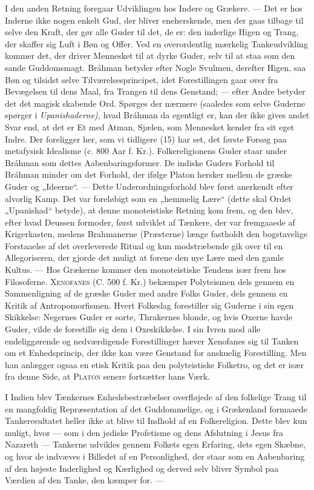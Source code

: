 \documentclass[12pt,a4paper,openany]{book}
\newcommand{\opage}[1]{\marginnote{\footnotesize\textit{[#1]}}}
\begin{document}
I den anden Retning foregaar Udviklingen hos Indere og Grækere. --- Det
er hos Inderne ikke nogen enkelt Gud, der bliver eneherskende, men der
gaas tilbage til selve den Kraft, der gør alle Guder til det, de er: den
inderlige Higen og Trang, der skaffer sig Luft i Bøn og Offer. Ved en
overordentlig mærkelig Tankeudvikling kommer det, der driver Mennesket
til at dyrke Guder, selv til at staa som den sande Guddomsmagt.
\opage{104}Bráhman betyder efter Nogle Svulmen, derefter Higen, saa Bøn
og tilsidst selve Tilværelsesprincipet, idet Forestillingen gaar over
fra Bevægelsen til dens Maal, fra Trangen til dens Genstand; --- efter
Andre betyder det det magisk skabende Ord. Spørges der nærmere (saaledes
som selve Guderne spørger i \textit{Upanishaderne),} hvad Bráhman da
egentligt er, kan der ikke gives andet Svar end, at det er Et med Atman,
Sjælen, som Mennesket kender fra sit eget Indre. Der foreligger her, som
vi tidligere (15) har set, det første Forsøg paa metafysisk Idealisme
(c. 800 Aar f. Kr.). Folkereligionens Guder staar under Bráhman som
dettes Aabenbaringsformer. De indiske Guders Forhold til Bráhman minder
om det Forhold, der ifølge Platon hersker mellem de græske Guder og
„Ideerne“. --- Dette Underordningsforhold blev først anerkendt efter
alvorlig Kamp. Det var foreløbigt som en „hemmelig Lære“ (dette skal
Ordet „Upanishad“ betyde), at denne monoteistiske Retning kom frem, og
den blev, efter hvad Deussen formoder, først udviklet af Tænkere, der
var fremgaaede af Krigerkasten, medens Brahmanerne (Præsterne) længe
fastholdt den bogstavelige Forstaaelse af det overleverede Ritual og kun
modstræbende gik over til en Allegoriseren, der gjorde det muligt at
forene den nye Lære med den gamle Kultus. --- Hos Grækerne kommer den
monoteistiske Tendens især frem hos Filosoferne. \textsc{Xenofanes} (C.
500 f. Kr.) bekæmper Polyteismen dels gennem en Sammenligning af de
græske Guder med andre Folks Guder, dels gennem en Kritik af
Antropomorfismen. Hvert Folkeslag forestiller sig Guderne i sin egen
Skikkelse: Negernes Guder er sorte, Thrakernes blonde, og hvis Oxerne
havde Guder, vilde de forestille sig dem i Oxeskikkelse. I sin Ivren mod
alle endeliggørende og nedværdigende Forestillinger hæver Xenofanes sig
til Tanken om et Enhedsprincip, der ikke kan være Genstand for anskuelig
Forestilling. Men han anlægger ogsaa en etisk Kritik paa den
polyteistiske Folketro, og det er især fra denne Side, at
\textsc{Platon} senere fortsætter hans Værk.

I Indien blev Tænkernes Enhedsbestræbelser overfløjede af den folkelige
Trang til en mangfoldig Repræsentation af det Guddommelige, og i
Grækenland formaaede Tankeresultatet heller ikke at blive til Indhold af
en Folkereligion. Dette blev kun muligt, hvor --- som i den jødiske
Profetisme og dens Afslutning i Jesus fra Nazareth --- Tankerne udvikles
gennem Folkets egen Erfaring, dets egen Skæbne, og hvor de indvæves i
Billedet af
\opage{105}en Personlighed, der staar som en Aabenbaring af den højeste
Inderlighed og Kærlighed og derved selv bliver Symbol paa Værdien af den
Tanke, den kæmper for. ---
\end{document}
